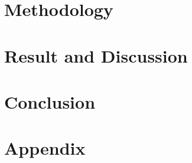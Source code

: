 \documentclass[12pt,a4paper]{report}
\begin{document}
\chapter{Methodology}
\label{methodology}


\chapter{Result and Discussion}
\label{result}


\chapter{Conclusion}
\label{conclusion}


%

%

\cleardoublepage
{}
{}


\cleardoublepage
\chapter*{Appendix}
\label{appendix}
\setcounter{chapter}{0}
\setcounter{section}{0}
\setcounter{subsection}{0}
\renewcommand{\thesection}{\arabic{section}}
\renewcommand{\theHsection}{appendix.\arabic{section}}
\renewcommand{\theHsubsection}{appendix.\arabic{section}.\arabic{subsection}}

\end{document}
